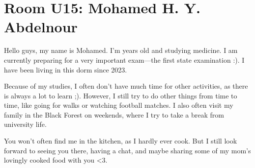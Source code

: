 \section{Room U15: Mohamed H. Y. Abdelnour} \label{sec:mohamedA}
%
\FPsub\result{\theCurrentDate}{\theBirthdate}
\FPdiv{}
\FPtrunc{}

Hello guys, my name is Mohamed. I’m \myage{} years old and studying medicine. I am currently preparing for a very important exam—the first state examination :). I have been living in this dorm since 2023.

Because of my studies, I often don’t have much time for other activities, as there is always a lot to learn ;). However, I still try to do other things from time to time, like going for walks or watching football matches. I also often visit my family in the Black Forest on weekends, where I try to take a break from university life.

You won’t often find me in the kitchen, as I hardly ever cook. But I still look forward to seeing you there, having a chat, and maybe sharing some of my mom’s lovingly cooked food with you <3.